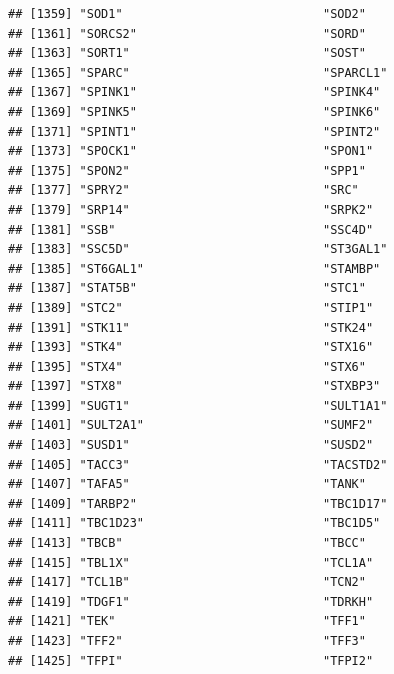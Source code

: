 \documentclass[
]{article}
\begin{document}
\begin{verbatim}
## [1359] "SOD1"                            "SOD2"                           
## [1361] "SORCS2"                          "SORD"                           
## [1363] "SORT1"                           "SOST"                           
## [1365] "SPARC"                           "SPARCL1"                        
## [1367] "SPINK1"                          "SPINK4"                         
## [1369] "SPINK5"                          "SPINK6"                         
## [1371] "SPINT1"                          "SPINT2"                         
## [1373] "SPOCK1"                          "SPON1"                          
## [1375] "SPON2"                           "SPP1"                           
## [1377] "SPRY2"                           "SRC"                            
## [1379] "SRP14"                           "SRPK2"                          
## [1381] "SSB"                             "SSC4D"                          
## [1383] "SSC5D"                           "ST3GAL1"                        
## [1385] "ST6GAL1"                         "STAMBP"                         
## [1387] "STAT5B"                          "STC1"                           
## [1389] "STC2"                            "STIP1"                          
## [1391] "STK11"                           "STK24"                          
## [1393] "STK4"                            "STX16"                          
## [1395] "STX4"                            "STX6"                           
## [1397] "STX8"                            "STXBP3"                         
## [1399] "SUGT1"                           "SULT1A1"                        
## [1401] "SULT2A1"                         "SUMF2"                          
## [1403] "SUSD1"                           "SUSD2"                          
## [1405] "TACC3"                           "TACSTD2"                        
## [1407] "TAFA5"                           "TANK"                           
## [1409] "TARBP2"                          "TBC1D17"                        
## [1411] "TBC1D23"                         "TBC1D5"                         
## [1413] "TBCB"                            "TBCC"                           
## [1415] "TBL1X"                           "TCL1A"                          
## [1417] "TCL1B"                           "TCN2"                           
## [1419] "TDGF1"                           "TDRKH"                          
## [1421] "TEK"                             "TFF1"                           
## [1423] "TFF2"                            "TFF3"                           
## [1425] "TFPI"                            "TFPI2"                          

\end{verbatim}
\end{document}
